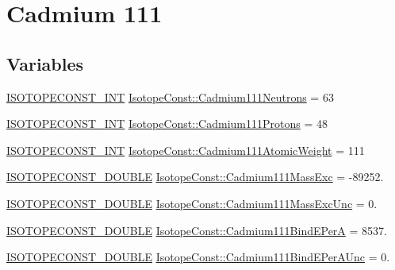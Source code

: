\hypertarget{group___isotope_const-_cadmium-_cd111}{}\section{Cadmium 111}
\label{group___isotope_const-_cadmium-_cd111}
\subsection*{Variables}
\begin{DoxyCompactItemize}
\item 
\mbox{\hyperlink{group___isotope_const-_macros_ga5f18360b3e99483a35c32d789e62621c}{I\+S\+O\+T\+O\+P\+E\+C\+O\+N\+S\+T\+\_\+\+I\+NT}} \mbox{\hyperlink{group___isotope_const-_cadmium-_cd111_ga9eaef22f7263ac3bdc4f2b95ff5a2ad2}{Isotope\+Const\+::\+Cadmium111\+Neutrons}} = 63
\item 
\mbox{\hyperlink{group___isotope_const-_macros_ga5f18360b3e99483a35c32d789e62621c}{I\+S\+O\+T\+O\+P\+E\+C\+O\+N\+S\+T\+\_\+\+I\+NT}} \mbox{\hyperlink{group___isotope_const-_cadmium-_cd111_ga7807b7806558e72a1439ba369aaddc2d}{Isotope\+Const\+::\+Cadmium111\+Protons}} = 48
\item 
\mbox{\hyperlink{group___isotope_const-_macros_ga5f18360b3e99483a35c32d789e62621c}{I\+S\+O\+T\+O\+P\+E\+C\+O\+N\+S\+T\+\_\+\+I\+NT}} \mbox{\hyperlink{group___isotope_const-_cadmium-_cd111_ga21c9d949040efc14325915d22523e568}{Isotope\+Const\+::\+Cadmium111\+Atomic\+Weight}} = 111
\item 
\mbox{\hyperlink{group___isotope_const-_macros_ga8f45a7272ce02c0b4c65c44636ed719a}{I\+S\+O\+T\+O\+P\+E\+C\+O\+N\+S\+T\+\_\+\+D\+O\+U\+B\+LE}} \mbox{\hyperlink{group___isotope_const-_cadmium-_cd111_ga18dc6667f7d01b7d076aa119490204a1}{Isotope\+Const\+::\+Cadmium111\+Mass\+Exc}} = -\/89252.
\item 
\mbox{\hyperlink{group___isotope_const-_macros_ga8f45a7272ce02c0b4c65c44636ed719a}{I\+S\+O\+T\+O\+P\+E\+C\+O\+N\+S\+T\+\_\+\+D\+O\+U\+B\+LE}} \mbox{\hyperlink{group___isotope_const-_cadmium-_cd111_ga72c876471b99f242cc0459f1bbd2a51b}{Isotope\+Const\+::\+Cadmium111\+Mass\+Exc\+Unc}} = 0.
\item 
\mbox{\hyperlink{group___isotope_const-_macros_ga8f45a7272ce02c0b4c65c44636ed719a}{I\+S\+O\+T\+O\+P\+E\+C\+O\+N\+S\+T\+\_\+\+D\+O\+U\+B\+LE}} \mbox{\hyperlink{group___isotope_const-_cadmium-_cd111_ga9c41dc9bceedb2148541c40ff2462db4}{Isotope\+Const\+::\+Cadmium111\+Bind\+E\+PerA}} = 8537.
\item 
\mbox{\hyperlink{group___isotope_const-_macros_ga8f45a7272ce02c0b4c65c44636ed719a}{I\+S\+O\+T\+O\+P\+E\+C\+O\+N\+S\+T\+\_\+\+D\+O\+U\+B\+LE}} \mbox{\hyperlink{group___isotope_const-_cadmium-_cd111_ga84f495e0990e5142343bd4f0d413567b}{Isotope\+Const\+::\+Cadmium111\+Bind\+E\+Per\+A\+Unc}} = 0.

\end{DoxyCompactItemize}
